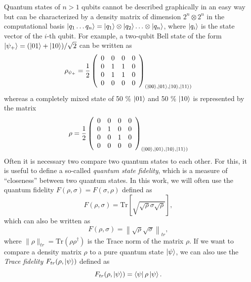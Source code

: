 \smallskip

Quantum states of $n>1$ qubits cannot be described graphically in an easy way but can be characterized by a density matrix of dimension $2^n\otimes 2^n$ in the computational basis $\left| q_1\hdots q_n \right>=\left| q_1 \right>\otimes\left| q_{2} \right>\hdots\otimes\left| q_n \right>$, where $\left| q_i \right>$ is the state vector of the $i$-th qubit. For example, a two-qubit Bell state of the form $\left| \psi_+ \right>=(\left| 01 \right>+\left| 10 \right>)/\sqrt{2}$ can be written as
%
\begin{equation}
\rho_{\psi_+} = \frac{1}{2}\left( \begin{array}{cccc} 0 & 0 & 0 & 0 \\ 0 & 1 & 1 & 0 \\ 0 & 1 & 1 & 0 \\ 0 & 0 & 0 & 0 \end{array} \right)_{(\left| 00 \right>,\left| 01 \right>,\left| 10 \right>,\left| 11 \right>)}
\end{equation}
%
whereas a completely mixed state of 50 \% $\left| 01 \right>$ and 50 \% $\left| 10 \right>$ is represented by the matrix
%
\begin{equation}
\rho = \frac{1}{2}\left( \begin{array}{cccc} 0 & 0 & 0 & 0 \\ 0 & 1 & 0 & 0 \\ 0 & 0 & 1 & 0 \\ 0 & 0 & 0 & 0 \end{array} \right)_{(\left| 00 \right>,\left| 01 \right>,\left| 10 \right>,\left| 11 \right>)}
\end{equation}
%
Often it is necessary two compare two quantum states to each other. For this, it is useful to define a so-called {\it quantum state fidelity}, which is a measure of ``closeness'' between two quantum states. In this work, we will often use the quantum fidelity $F(\rho,\sigma)=F(\sigma,\rho)$ defined as
%
\begin{equation}
F(\rho,\sigma) = \mathrm{Tr}\left[\sqrt{\sqrt{\rho}\sigma\sqrt{\rho}}\right], \label{eq:quantum_state_fidelity}
\end{equation}
%
which can also be written as
%
\begin{equation}
F(\rho,\sigma) = \left\|\sqrt{\rho}\sqrt{\sigma}\right\|_{tr},
\end{equation}
%
where $\|\rho\|_{tr}=\mathrm{Tr}(\rho\rho^\dagger)$ is the Trace norm of the matrix $\rho$. If we want to compare a density matrix $\rho$ to a pure quantum state $\left| \psi \right>$, we can also use the {\it Trace fidelity} $F_{tr}(\rho,\left| \psi \right>)$ defined as
%
\begin{equation}
F_{tr}(\rho,\left| \psi \right>) = \left< \psi \right|\rho\left| \psi \right>. \label{eq:quantum_trace_fidelity}
\end{equation}
%
